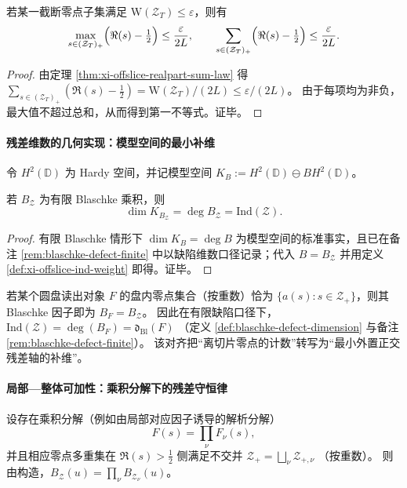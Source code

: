 \begin{corollary}[近临界线稳定性]\label{cor:xi-offslice-near-critical-stability}
若某一截断零点子集满足 \(\mathrm{W}(\mathcal Z_T)\le \varepsilon\)，则有
\[
\max_{s\in(\mathcal Z_T)_{+}}\Bigl(\Re(s)-\tfrac12\Bigr)\le \frac{\varepsilon}{2L},
\qquad
\sum_{s\in(\mathcal Z_T)_{+}}\Bigl(\Re(s)-\tfrac12\Bigr)\le \frac{\varepsilon}{2L}.
\]
\end{corollary}

\begin{proof}
由定理 \ref{thm:xi-offslice-realpart-sum-law} 得
\(
\sum_{s\in(\mathcal Z_T)_{+}}(\Re(s)-\tfrac12)=\mathrm{W}(\mathcal Z_T)/(2L)\le \varepsilon/(2L)
\)。
由于每项均为非负，最大值不超过总和，从而得到第一不等式。证毕。
\end{proof}

\paragraph{残差维数的几何实现：模型空间的最小补维}
令 \(H^2(\mathbb{D})\) 为 Hardy 空间，并记模型空间 \(K_B:=H^2(\mathbb{D})\ominus BH^2(\mathbb{D})\)。

\begin{proposition}[残差维数的几何实现]\label{prop:xi-offslice-model-space-dimension}
若 \(B_{\mathcal Z}\) 为有限 Blaschke 乘积，则
\[
\dim K_{B_{\mathcal Z}}=\deg B_{\mathcal Z}=\mathrm{Ind}(\mathcal Z).
\]
\end{proposition}

\begin{proof}
有限 Blaschke 情形下 \(\dim K_B=\deg B\) 为模型空间的标准事实，且已在备注 \ref{rem:blaschke-defect-finite} 中以缺陷维数口径记录；代入 \(B=B_{\mathcal Z}\) 并用定义 \ref{def:xi-offslice-ind-weight} 即得。证毕。
\end{proof}

\begin{remark}\label{rem:xi-offslice-ind-equals-dbl}
若某个圆盘读出对象 \(F\) 的盘内零点集合（按重数）恰为 \(\{a(s):s\in\mathcal Z_{+}\}\)，则其 Blaschke 因子即为 \(B_F=B_{\mathcal Z}\)。
因此在有限缺陷口径下，
\(
\mathrm{Ind}(\mathcal Z)=\deg(B_F)=\mathfrak d_{\mathrm{Bl}}(F)
\)
（定义 \ref{def:blaschke-defect-dimension} 与备注 \ref{rem:blaschke-defect-finite}）。
该对齐把“离切片零点的计数”转写为“最小外置正交残差轴的补维”。
\end{remark}

\paragraph{局部—整体可加性：乘积分解下的残差守恒律}
设存在乘积分解（例如由局部对应因子诱导的解析分解）
\[
F(s)=\prod_{\nu}F_{\nu}(s),
\]
并且相应零点多重集在 \(\Re(s)>\tfrac12\) 侧满足不交并
\(
\mathcal Z_{+}=\bigsqcup_{\nu}\mathcal Z_{+,\nu}
\)
（按重数）。
则由构造，\(B_{\mathcal Z}(u)=\prod_{\nu}B_{\mathcal Z_\nu}(u)\)。

